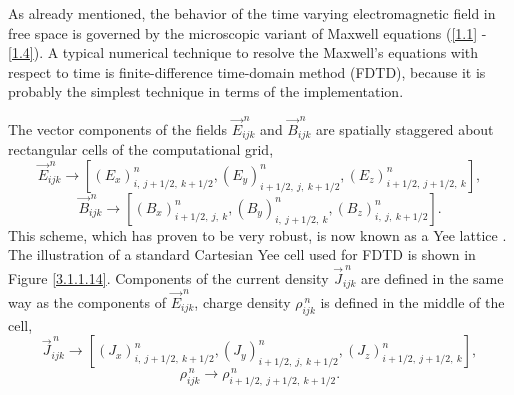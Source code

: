 As already mentioned, the behavior of the time varying electromagnetic field in free space is governed by the microscopic variant of Maxwell equations (\ref{1.1} - \ref{1.4}). A typical numerical technique to resolve the Maxwell's equations with respect to time is finite-difference time-domain method (FDTD), because it is probably the simplest technique in terms of the implementation.

The vector components of the fields $ \vec{E}_{ijk}^{\,n} $ and $ \vec{B}_{ijk}^{\,n} $ are spatially staggered about rectangular cells of the computational grid,
\begin{equation}
\label{3.1.1.4}
\vec{E}_{ijk}^{\,n} \rightarrow \left[\left(E_{x}\right)^{n}_{i,\: j + 1/2,\: k + 1/2}, \left(E_{y}\right)^{n}_{i + 1/2,\: j,\: k + 1/2}, \left(E_{z}\right)^{n}_{i + 1/2,\: j + 1/2,\: k} \right],
\end{equation}
\begin{equation}
\label{3.1.1.5}
\vec{B}_{ijk}^{\,n} \rightarrow \left[\left(B_{x}\right)^{n}_{i + 1/2,\: j,\: k}, \left(B_{y}\right)^{n}_{i,\: j + 1/2,\: k}, \left(B_{z}\right)^{n}_{i,\: j,\: k + 1/2} \right].
\end{equation}
This scheme, which has proven to be very robust, is now known as a Yee lattice \cite{yee}. The illustration of a standard Cartesian Yee cell used for FDTD is shown in Figure \ref{3.1.1.14}. Components of the current density $ \vec{J}_{ijk}^{\:n} $ are defined in the same way as the components of $ \vec{E}_{ijk}^{\:n} $, charge density $ \rho_{ijk}^{\:n} $ is defined in the middle of the cell,
\begin{equation}
\vec{J}_{ijk}^{\,n} \rightarrow \left[\left(J_{x}\right)^{n}_{i,\: j + 1/2,\: k + 1/2}, \left(J_{y}\right)^{n}_{i + 1/2,\: j,\: k + 1/2}, \left(J_{z}\right)^{n}_{i + 1/2,\: j + 1/2,\: k} \right],
\end{equation}
\begin{equation}
\rho_{ijk}^{\,n} \rightarrow \rho_{i + 1/2,\: j + 1/2,\: k + 1/2}^{\,n}.
\end{equation}

